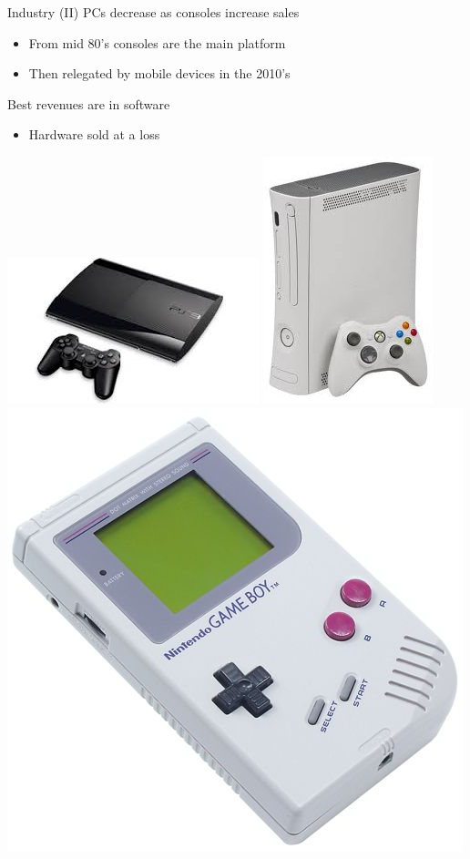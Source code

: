 \documentclass[10pt,compress]{beamer} %
\begin{document}
\begin{frame}{Industry (II)}
		PCs decrease as consoles increase sales
	    \begin{itemize}
		    \item From mid 80's consoles are the main platform
            \item Then relegated by mobile devices in the 2010's
	    \end{itemize}

		Best revenues are in software
		\begin{itemize}
		\item Hardware sold at a loss
		\end{itemize}

	\begin{center}
	\includegraphics[width=0.3\linewidth]{figs/ps3.jpeg}
	\includegraphics[width=0.15\linewidth]{figs/xbox.jpeg}
	\includegraphics[width=0.2\linewidth]{figs/gameboy}
	\end{center}
\end{frame}
\end{document}
